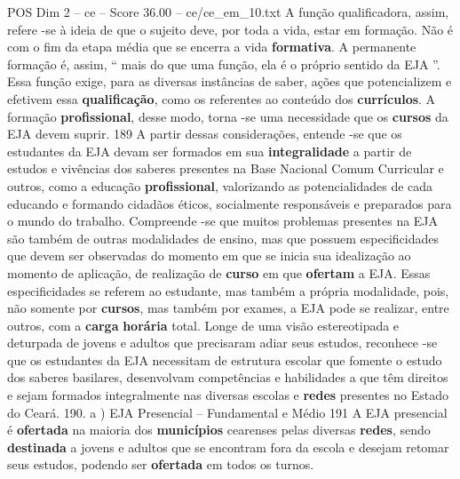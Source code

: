 \begin{textsample}{POS Dim 2 – ce – Score 36.00 – ce/ce\_em\_10.txt}
A função qualificadora, assim, refere -se à ideia de que o sujeito deve, por toda a vida, estar em formação.
Não é com o fim da etapa média que se encerra a vida \textbf{formativa}.
A permanente formação é, assim, “ mais do que uma função, ela é o próprio sentido da EJA ”.
Essa função exige, para as diversas instâncias de saber, ações que potencializem e efetivem essa \textbf{qualificação}, como os referentes ao conteúdo dos \textbf{currículos}.
A formação \textbf{profissional}, desse modo, torna -se uma necessidade que os \textbf{cursos} da EJA devem suprir. 189 A partir dessas considerações, entende -se que os estudantes da EJA devam ser formados em sua \textbf{integralidade} a partir de estudos e vivências dos saberes presentes na Base Nacional Comum Curricular e outros, como a educação \textbf{profissional}, valorizando as potencialidades de cada educando e formando cidadãos éticos, socialmente responsáveis e preparados para o mundo do trabalho.
Compreende -se que muitos problemas presentes na EJA são também de outras modalidades de ensino, mas que possuem especificidades que devem ser observadas do momento em que se inicia sua idealização ao momento de aplicação, de realização de \textbf{curso} em que \textbf{ofertam} a EJA.
Essas especificidades se referem ao estudante, mas também a própria modalidade, pois, não somente por \textbf{cursos}, mas também por exames, a EJA pode se realizar, entre outros, com a \textbf{carga} \textbf{horária} total.
Longe de uma visão estereotipada e deturpada de jovens e adultos que precisaram adiar seus estudos, reconhece -se que os estudantes da EJA necessitam de estrutura escolar que fomente o estudo dos saberes basilares, desenvolvam competências e habilidades a que têm direitos e sejam formados integralmente nas diversas escolas e \textbf{redes} presentes no Estado do Ceará. 190. a ) EJA Presencial – Fundamental e Médio 191 A EJA presencial é \textbf{ofertada} na maioria dos \textbf{municípios} cearenses pelas diversas \textbf{redes}, sendo \textbf{destinada} a jovens e adultos que se encontram fora da escola e desejam retomar seus estudos, podendo ser \textbf{ofertada} em todos os turnos.

\end{textsample}
